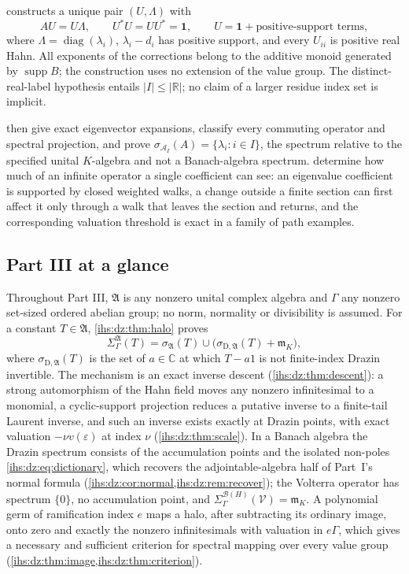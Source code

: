\documentclass[11pt,a4paper]{article}
\numberwithin{equation}{section}
\theoremstyle{definition}
\theoremstyle{remark}
\newcommand{\C}{\mathbb C}
\newcommand{\R}{\mathbb R}
\newcommand{\K}{K}
\newcommand{\mK}{\mathfrak m_K}
\newcommand{\B}{\mathcal B(H)}
\newcommand{\Arf}{\mathcal A_I}
\newcommand{\supp}{\operatorname{supp}}
\newcommand{\diag}{\operatorname{diag}}
\newcommand{\Id}{\mathbf 1}
\newcommand{\eps}{\varepsilon}
\newcommand{\abs}[1]{\lvert#1\rvert}
\newcommand{\Alg}{\mathfrak A}
\newcommand{\SigA}{\Sigma^{\Alg}_\Gamma}
\newcommand{\sigD}{\sigma_{\mathrm D,\Alg}}
\begin{document}
 constructs a unique pair $(U,\Lambda)$ with
\[
 AU=U\Lambda,\qquad U^*U=UU^*=\Id,\qquad
 U=\Id+\text{positive-support terms},
\]
where $\Lambda=\diag(\lambda_i)$, $\lambda_i-d_i$ has positive support, and
every $U_{ii}$ is positive real Hahn. All exponents of the corrections
belong to the additive monoid generated by $\supp B$; the construction uses
no extension of the value group. The distinct-real-label hypothesis entails
$\abs I\le\abs\R$; no claim of a larger residue index set is implicit.

 then
give exact eigenvector expansions, classify every commuting operator and
spectral projection, and prove
$\sigma_{\Arf}(A)=\{\lambda_i:i\in I\}$, the spectrum relative to the
specified unital $\K$-algebra and not a Banach-algebra spectrum.
determine how much of an infinite operator a single coefficient can see: an
eigenvalue coefficient is supported by closed weighted walks, a change
outside a finite section can first affect it only through a walk that leaves
the section and returns, and the corresponding valuation threshold is exact
in a family of path examples.

\subsection{Part III at a glance}\label{ihs:sec:glancethree}
Throughout Part III, $\Alg$ is any nonzero unital complex algebra and
$\Gamma$ any nonzero set-sized ordered abelian group; no norm, normality or
divisibility is assumed. For a constant $T\in\Alg$,
\cref{ihs:dz:thm:halo} proves
\[
 \SigA(T)=\sigma_\Alg(T)\cup\bigl(\sigD(T)+\mK\bigr),
\]
where $\sigD(T)$ is the set of $a\in\C$ at which $T-a1$ is not
finite-index Drazin invertible. The mechanism is an exact inverse descent
(\cref{ihs:dz:thm:descent}): a strong automorphism of the Hahn field moves
any nonzero infinitesimal to a monomial, a cyclic-support projection reduces
a putative inverse to a finite-tail Laurent inverse, and such an inverse
exists exactly at Drazin points, with exact valuation $-\nu v(\eps)$ at index
$\nu$ (\cref{ihs:dz:thm:scale}). In a Banach algebra the Drazin spectrum
consists of the accumulation points and the isolated non-poles
\eqref{ihs:dz:eq:dictionary}, which recovers the adjointable-algebra half of
Part~I's normal formula (\cref{ihs:dz:cor:normal,ihs:dz:rem:recover}); the
Volterra operator has spectrum $\{0\}$, no accumulation point, and
$\Sigma^{\B}_\Gamma(\mathcal V)=\mK$. A polynomial germ of ramification index
$e$ maps a halo, after subtracting its ordinary image, onto zero and exactly
the nonzero infinitesimals with valuation in $e\Gamma$,
which gives a necessary and sufficient criterion for spectral mapping over
every value group (\cref{ihs:dz:thm:image,ihs:dz:thm:criterion}).
\end{document}
